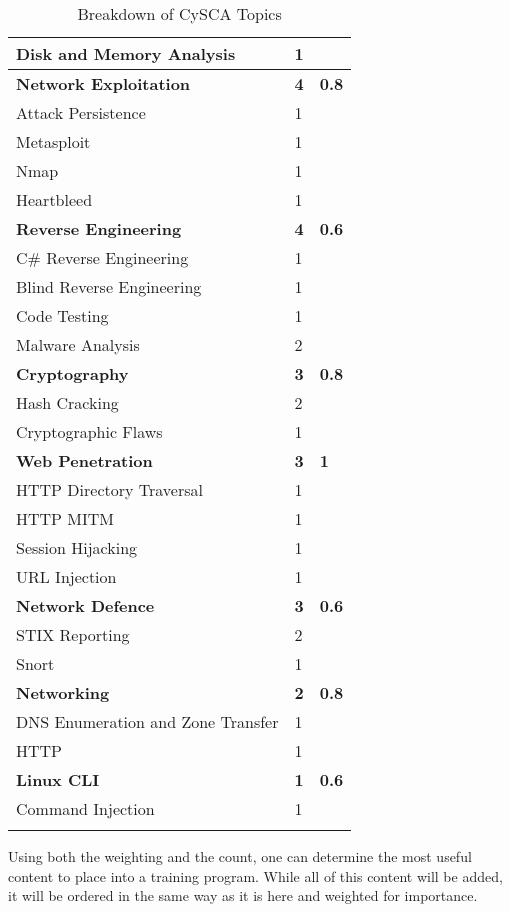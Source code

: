 \documentclass[twoside,a4paper,11pt]{report}
\begin{document}
\begin{center}
\begin{longtable}{| l | l | l |}
				\quad Disk and Memory Analysis & 1 & \\ \hline 
				\textbf{Network Exploitation} & \textbf{4} & \textbf{0.8} \\ \hline 
				\quad Attack Persistence & 1 & \\ \hline 
				\quad Metasploit & 1 & \\ \hline 
				\quad Nmap & 1 & \\ \hline 
				\quad Heartbleed & 1 & \\ \hline
				\textbf{Reverse Engineering} & \textbf{4} & \textbf{0.6}\\ \hline 
				\quad C\# Reverse Engineering & 1 & \\ \hline
				\quad Blind Reverse Engineering & 1 & \\ \hline 
				\quad Code Testing & 1 & \\ \hline 
				\quad Malware Analysis & 2 & \\ \hline
				\textbf{Cryptography} & \textbf{3} & \textbf{0.8} \\ \hline 
				\quad Hash Cracking & 2 & \\ \hline
				\quad Cryptographic Flaws & 1 & \\ \hline 
				\textbf{Web Penetration} & \textbf{3} & \textbf{1} \\ \hline
				\quad HTTP Directory Traversal & 1 & \\ \hline
				\quad HTTP MITM & 1 & \\ \hline
				\quad Session Hijacking & 1 & \\ \hline
				\quad URL Injection & 1 & \\ \hline
				\textbf{Network Defence} & \textbf{3} & \textbf{0.6} \\ \hline
				\quad STIX Reporting & 2 & \\ \hline
				\quad Snort & 1 & \\ \hline
				\textbf{Networking} & \textbf{2} & \textbf{0.8}\\ \hline
				\quad DNS Enumeration and Zone Transfer & 1 & \\ \hline 
				\quad HTTP & 1 & \\ \hline 
				\textbf{Linux CLI} & \textbf{1} &\textbf{0.6} \\ \hline
				\quad Command Injection & 1 & \\ \hline 
				\noalign{\vskip 0.5cm}
				\caption{\label{tab:CySCABreakdown}Breakdown of CySCA Topics}
				\vspace{-1.3cm}
			\end{longtable}
		\end{center}
		Using both the weighting and the count, one can determine the most useful content to place into a training program. 
		While all of this content will be added, it will be ordered in the same way as it is here and weighted for importance. 
\end{document}
